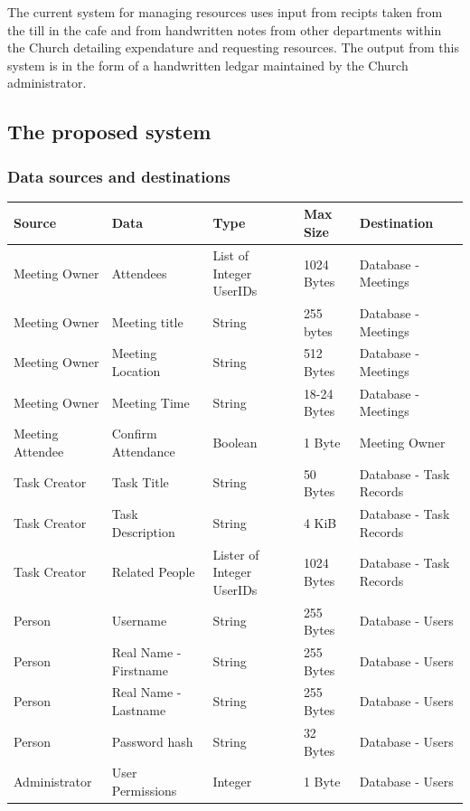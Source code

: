 The current system for managing resources uses input from recipts taken from the till in the cafe and from handwritten notes from
other departments within the Church detailing expendature and requesting resources. The output from this system is in the form of a handwritten ledgar maintained by the Church administrator.

\subsection{The proposed system}

\subsubsection{Data sources and destinations}

\begin{table}[]
\centering
\label{my-label}
\begin{tabular}{|l|l|l|l|l|}
\hline
Source & Data & Type & Max Size & Destination \\ \hline
Meeting Owner & Attendees & List of Integer UserIDs & 1024 Bytes & Database - Meetings \\ \hline
Meeting Owner & Meeting title & String & 255 bytes & Database - Meetings \\ \hline
Meeting Owner & Meeting Location & String & 512 Bytes & Database - Meetings \\ \hline
Meeting Owner & Meeting Time & String & 18-24 Bytes & Database - Meetings \\ \hline
Meeting Attendee & Confirm Attendance & Boolean & 1 Byte & Meeting Owner \\ \hline
Task Creator & Task Title & String & 50 Bytes & Database - Task Records \\ \hline
Task Creator & Task Description & String & 4 KiB & Database - Task Records \\ \hline
Task Creator & Related People & Lister of Integer UserIDs & 1024 Bytes & Database - Task Records \\ \hline
Person & Username & String & 255 Bytes & Database - Users \\ \hline
Person & Real Name - Firstname & String & 255 Bytes & Database - Users \\ \hline
Person & Real Name - Lastname & String & 255 Bytes & Database - Users \\ \hline
Person & Password hash & String & 32 Bytes & Database - Users \\ \hline
Administrator & User Permissions & Integer & 1 Byte & Database - Users \\ \hline

\end{tabular}
\end{table}
